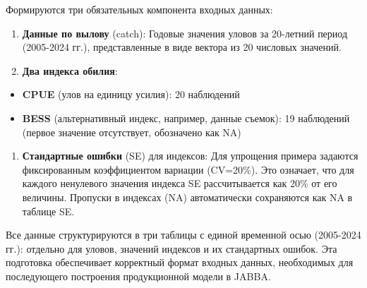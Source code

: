 \documentclass[
  letterpaper,
  DIV=11,
  numbers=noendperiod]{scrreprt}
\providecommand{\tightlist}{%
  \setlength{\itemsep}{0pt}\setlength{\parskip}{0pt}}
\begin{document}
Формируются три обязательных компонента входных данных:

\begin{enumerate}
\def\labelenumi{\arabic{enumi}.}
\item
  \textbf{Данные по вылову} (catch): Годовые значения уловов за
  20-летний период (2005-2024 гг.), представленные в виде вектора из 20
  числовых значений.
\item
  \textbf{Два индекса обилия}:
\end{enumerate}

\begin{itemize}
\item
  \textbf{CPUE} (улов на единицу усилия): 20 наблюдений
\item
  \textbf{BESS} (альтернативный индекс, например, данные съемок): 19
  наблюдений (первое значение отсутствует, обозначено как NA)
\end{itemize}

\begin{enumerate}
\def\labelenumi{\arabic{enumi}.}
\setcounter{enumi}{2}
\tightlist
\item
  \textbf{Стандартные ошибки} (SE) для индексов: Для упрощения примера
  задаются фиксированным коэффициентом вариации (CV=20\%). Это означает,
  что для каждого ненулевого значения индекса SE рассчитывается как 20\%
  от его величины. Пропуски в индексах (NA) автоматически сохраняются
  как NA в таблице SE.
\end{enumerate}

Все данные структурируются в три таблицы с единой временной осью
(2005-2024 гг.): отдельно для уловов, значений индексов и их стандартных
ошибок. Эта подготовка обеспечивает корректный формат входных данных,
необходимых для последующего построения продукционной модели в JABBA.
\end{document}
